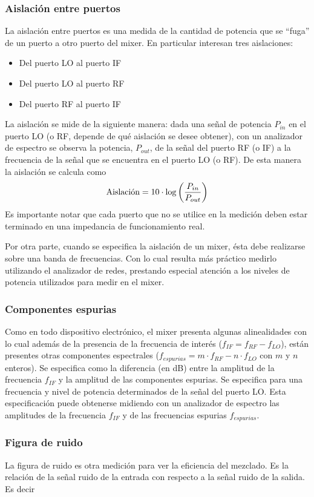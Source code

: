 \documentclass[a4paper,10pt]{article}
\begin{document}
		\subsubsection{Aislación entre puertos}
		La aislación entre puertos es una medida de la cantidad de potencia que se ``fuga'' de un puerto a otro puerto del mixer.
		En particular interesan tres aislaciones:
		\begin{itemize}
		\item Del puerto LO al puerto IF
		\item Del puerto LO al puerto RF
		\item Del puerto RF al puerto IF
		\end{itemize}
		La aislaci\'on se mide de la siguiente manera: dada una se\~nal de potencia $P_{in}$ en el puerto LO (o RF, depende de qu\'e aislaci\'on se desee obtener), con un analizador de espectro se observa la potencia, $P_{out}$, de la señal del puerto RF (o IF) a la frecuencia de la señal que se encuentra en el puerto LO (o RF). De esta manera la aislaci\'on se calcula como		$$\textmd{Aislaci\'on}=10\cdot\log\left(\frac{P_{in}}{P_{out}}\right)$$
		Es importante notar que cada puerto que no se utilice en la medici\'on deben estar terminado en una impedancia de funcionamiento real.
		
		Por otra parte, cuando se especifica la aislaci\'on de un mixer, \'esta debe realizarse sobre una banda de frecuencias. Con lo cual resulta m\'as pr\'actico medirlo utilizando el analizador de redes, prestando especial atenci\'on a los niveles de potencia utilizados para medir en el mixer.
		\subsubsection{Componentes espurias}\label{todosputos}
		Como en todo dispositivo electr\'onico, el mixer presenta algunas alinealidades con lo cual adem\'as de la presencia de la frecuencia de inter\'es ($f_{IF}=f_{RF}-f_{LO}$), est\'an presentes otras componentes espectrales ($f_{espurias}=m\cdot f_{RF}-n\cdot f_{LO}$ con $m$ y $n$ enteros). Se especifica como la diferencia (en dB) entre la amplitud de la frecuencia $f_{IF}$ y la amplitud de las componentes espurias. Se especifica para una frecuencia y nivel de potencia determinados de la señal del puerto LO.
		Esta especificaci\'on puede obtenerse midiendo con un analizador de espectro las amplitudes de la frecuencia $f_{IF}$ y de las frecuencias espurias $f_{espurias}$.

		\subsubsection{Figura de ruido}
		\indent La figura de ruido es otra medición para ver la eficiencia del 
		mezclado. Es la relación de la señal ruido de la entrada con respecto a
		la señal ruido de la salida. Es decir
		
\end{document}
